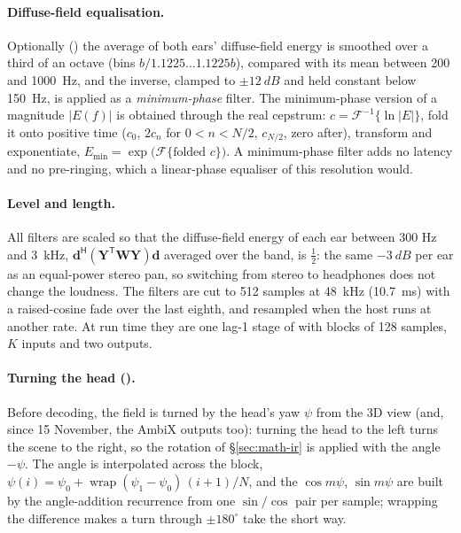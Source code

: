 \paragraph{Diffuse-field equalisation.} Optionally () the average of both ears' diffuse-field
energy is smoothed over a third of an octave (bins $b/1.1225\dots1.1225b$), compared with its mean between 200 and
\SI{1000}{Hz}, and the inverse, clamped to $\pm\SI{12}{dB}$ and held constant below \SI{150}{Hz}, is applied as a
\emph{minimum-phase} filter. The minimum-phase version of a magnitude $|E(f)|$ is obtained through the real cepstrum:
$c = \mathcal F^{-1}\{\ln|E|\}$, fold it onto positive time ($c_0$, $2c_n$ for $0<n<N/2$, $c_{N/2}$, zero after),
transform and exponentiate, $E_\mathrm{min} = \exp\bigl(\mathcal F\{\text{folded } c\}\bigr)$. A minimum-phase filter adds
no latency and no pre-ringing, which a linear-phase equaliser of this resolution would.

\paragraph{Level and length.} All filters are scaled so that the diffuse-field energy of each ear between 300 Hz and
\SI{3}{kHz}, $\mathbf d^{\mathsf H}(\mathbf Y^{\mathsf T}\mathbf W\mathbf Y)\mathbf d$ averaged over the band, is $\tfrac12$:
the same $-\SI{3}{dB}$ per ear as an equal-power stereo pan, so switching from stereo to headphones does not change
the loudness. The filters are cut to 512 samples at \SI{48}{kHz} (\SI{10.7}{ms}) with a raised-cosine fade over the
last eighth, and resampled when the host runs at another rate. At run time they are one lag-1 stage of
 with blocks of 128 samples, $K$ inputs and two outputs.

\paragraph{Turning the head ().} Before decoding, the field is turned by the head's yaw $\psi$
from the 3D view (and, since 15 November, the AmbiX outputs too): turning the head to the left turns the scene to the
right, so the rotation of \S\ref{sec:math-ir} is applied with the angle $-\psi$. The angle is interpolated across the
block, $\psi(i) = \psi_0 + \operatorname{wrap}(\psi_1-\psi_0)\,(i+1)/N$, and the $\cos m\psi$, $\sin m\psi$ are built by the
angle-addition recurrence from one $\sin/\cos$ pair per sample; wrapping the difference makes a turn through
$\pm180^\circ$ take the short way.

